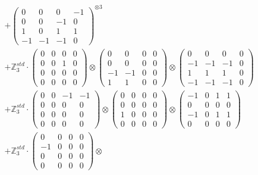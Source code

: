 \documentclass{article}
\begin{document}
{\begin{align}
        &+ \label{Rs16-Rc11-Solution-5-c16} \begin{pmatrix} 0 & 0 & 0 & -1 \\ 0 & 0 & -1 & 0 \\ 1 & 0 & 1 & 1 \\ -1 & -1 & -1 & 0 \end{pmatrix}^{\otimes 3} \\
        &+ \label{Rs16-Rc11-Solution-5-c17} \mathbb{Z}_3^{std} \cdot 
            \begin{pmatrix} 0 & 0 & 0 & 0 \\ 0 & 0 & 1 & 0 \\ 0 & 0 & 0 & 0 \\ 0 & 0 & 0 & 0 \end{pmatrix} \otimes 
            \begin{pmatrix} 0 & 0 & 0 & 0 \\ 0 & 0 & 0 & 0 \\ -1 & -1 & 0 & 0 \\ 1 & 1 & 0 & 0 \end{pmatrix} \otimes 
            \begin{pmatrix} 0 & 0 & 0 & 0 \\ -1 & -1 & -1 & 0 \\ 1 & 1 & 1 & 0 \\ -1 & -1 & -1 & 0 \end{pmatrix} \\ 
        &+ \label{Rs16-Rc11-Solution-5-c18} \mathbb{Z}_3^{std} \cdot 
            \begin{pmatrix} 0 & 0 & -1 & -1 \\ 0 & 0 & 0 & 0 \\ 0 & 0 & 0 & 0 \\ 0 & 0 & 0 & 0 \end{pmatrix} \otimes 
            \begin{pmatrix} 0 & 0 & 0 & 0 \\ 0 & 0 & 0 & 0 \\ 1 & 0 & 0 & 0 \\ 0 & 0 & 0 & 0 \end{pmatrix} \otimes 
            \begin{pmatrix} -1 & 0 & 1 & 1 \\ 0 & 0 & 0 & 0 \\ -1 & 0 & 1 & 1 \\ 0 & 0 & 0 & 0 \end{pmatrix} \\ 
        &+ \label{Rs16-Rc11-Solution-5-c19} \mathbb{Z}_3^{std} \cdot 
            \begin{pmatrix} 0 & 0 & 0 & 0 \\ -1 & 0 & 0 & 0 \\ 0 & 0 & 0 & 0 \\ 0 & 0 & 0 & 0 \end{pmatrix} \otimes 

\end{align}}
\end{document}
